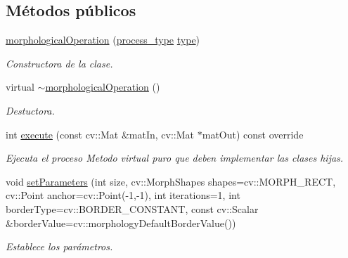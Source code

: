 \subsection*{Métodos públicos}
\begin{DoxyCompactItemize}
\item 
\hyperlink{class_i3_d_1_1morphological_operation_adccfcde6d2223d29dd6c7190cb4b4c23}{morphological\+Operation} (\hyperlink{group___img_proc_gaa7be5aaaa0e9ec5885c5bd72f41dad47}{process\+\_\+type} \hyperlink{class_i3_d_1_1_img_processing_af87bd3404d91bca669b04af1f45cbff0}{type})
\begin{DoxyCompactList}\small\item\em Constructora de la clase. \end{DoxyCompactList}\item 
virtual \hyperlink{class_i3_d_1_1morphological_operation_a21bb0f558a0c0d2c670393ec84be231f}{$\sim$morphological\+Operation} ()
\begin{DoxyCompactList}\small\item\em Destuctora. \end{DoxyCompactList}\item 
int \hyperlink{class_i3_d_1_1morphological_operation_aafa533c5999bed3e9d4680a6434cb43e}{execute} (const cv\+::\+Mat \&mat\+In, cv\+::\+Mat $\ast$mat\+Out) const  override
\begin{DoxyCompactList}\small\item\em Ejecuta el proceso Metodo virtual puro que deben implementar las clases hijas. \end{DoxyCompactList}\item 
void \hyperlink{class_i3_d_1_1morphological_operation_adb431685feba88a87c71d13e1e3b2ce2}{set\+Parameters} (int size, cv\+::\+Morph\+Shapes shapes=cv\+::\+M\+O\+R\+P\+H\+\_\+\+R\+E\+CT, cv\+::\+Point anchor=cv\+::\+Point(-\/1,-\/1), int iterations=1, int border\+Type=cv\+::\+B\+O\+R\+D\+E\+R\+\_\+\+C\+O\+N\+S\+T\+A\+NT, const cv\+::\+Scalar \&border\+Value=cv\+::morphology\+Default\+Border\+Value())
\begin{DoxyCompactList}\small\item\em Establece los parámetros. \end{DoxyCompactList}\end{DoxyCompactItemize}
